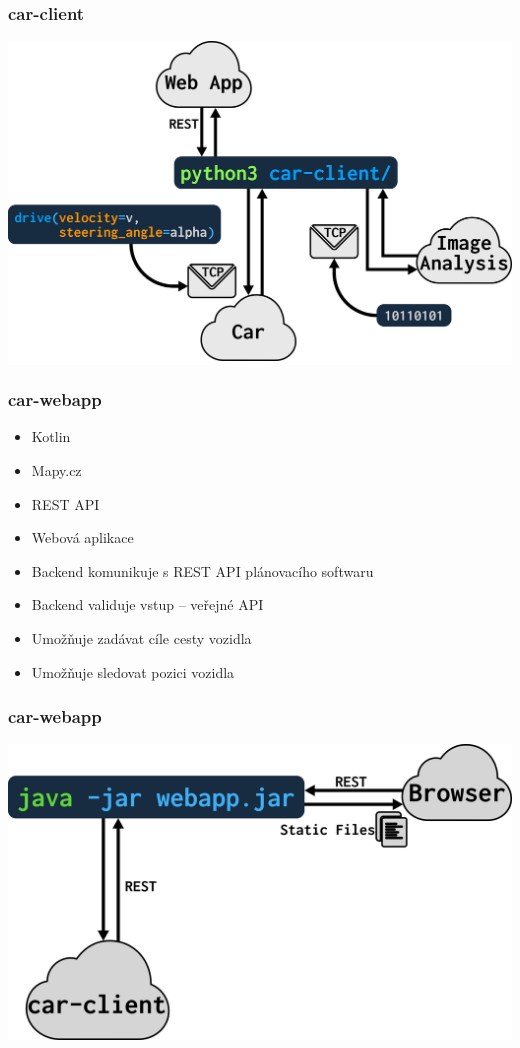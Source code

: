 \documentclass{beamer}
\begin{document}
\begin{frame}
    \frametitle{car-client}
    \begin{center}
        \includegraphics[width=0.9\columnwidth]{car-client}
    \end{center}
\end{frame}

\begin{frame}
    \frametitle{car-webapp}
    \begin{itemize}
        \item Kotlin
        \item Mapy.cz
        \item REST API
        \item Webová aplikace
        \item Backend komunikuje s REST API plánovacího softwaru
        \item Backend validuje vstup -- veřejné API
        \item Umožňuje zadávat cíle cesty vozidla
        \item Umožňuje sledovat pozici vozidla
    \end{itemize}
\end{frame}

\begin{frame}
    \frametitle{car-webapp}
    \begin{center}
        \includegraphics[width=0.9\columnwidth]{car-webapp}
    \end{center}
\end{frame}
\end{document}
